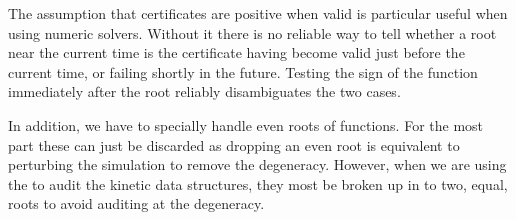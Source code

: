 The assumption that certificates are positive when valid is particular
useful when using numeric solvers.  Without it there is no reliable
way to tell whether a root near the current time is the certificate
having become valid just before the current time, or failing shortly
in the future. Testing the sign of the function immediately after the
root reliably disambiguates the two cases.

In addition, we have to specially handle even roots of functions. For
the most part these can just be discarded as dropping an even root is
equivalent to perturbing the simulation to remove the degeneracy.
However, when we are using the  to audit the
kinetic data structures, they most be broken up in to two, equal,
roots to avoid auditing at the degeneracy.

